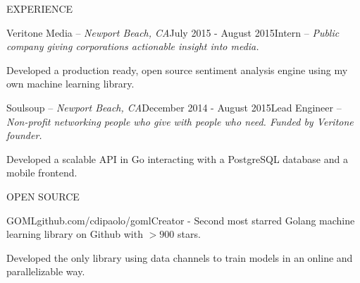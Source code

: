 \documentclass{resume} %
\begin{document}
\begin{rSection}{EXPERIENCE}
\begin{rSubsection}{Veritone Media -- {\it Newport Beach, CA}}{July 2015 - August 2015}{Intern -- {\sl Public company giving corporations actionable insight into media.}}

\item Developed a production ready, open source sentiment analysis engine using my own machine learning library.
\end{rSubsection}

\begin{rSubsection}{Soulsoup -- {\it Newport Beach, CA}}{December 2014 - August 2015}{Lead Engineer -- {\sl Non-profit networking people who give with people who need. Funded by Veritone founder.}}

\item Developed a scalable API in Go interacting with a PostgreSQL database and a
    mobile frontend.
\end{rSubsection} 

\end{rSection}


\begin{rSection}{OPEN SOURCE}

\begin{rSubsection}{GOML}{\textsf{github.com/cdipaolo/goml}}{Creator - Second most starred Golang machine learning library on Github with $> 900$ stars.}

\item Developed the only library using data channels to train models in an online and parallelizable way.
\end{rSubsection}

\end{rSection}

\end{document}
